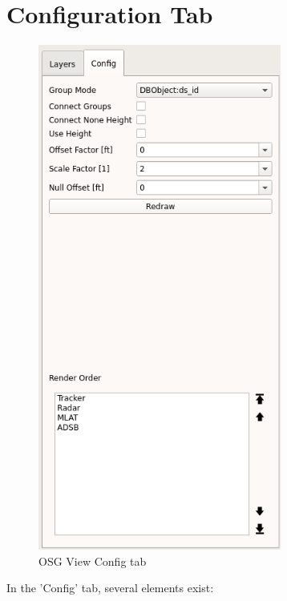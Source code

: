 \section{Configuration Tab}
\label{sec:osgview_config}

\begin{figure}[H]
    \hspace*{-2cm}
    \includegraphics[width=8cm,frame]{../screenshots/osgview_config_tab.png}
  \caption{OSG View Config tab}
\end{figure}


In the 'Config' tab, several elements exist:

